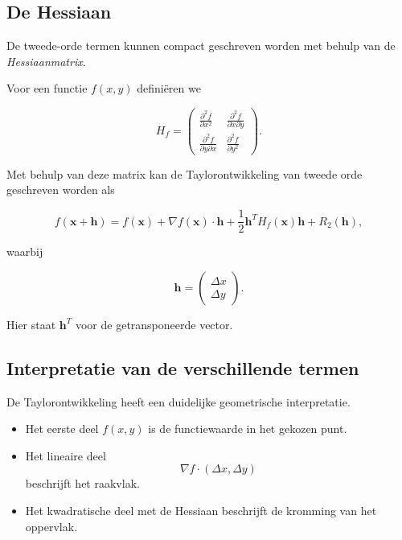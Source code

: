 \documentclass[11pt,a4paper]{article}
\begin{document}
    \subsection{De Hessiaan}

    De tweede-orde termen kunnen compact geschreven worden met behulp van
    de \textit{Hessiaanmatrix}.

    Voor een functie $f(x,y)$ definiëren we

    \[
        H_f =
        \begin{pmatrix}
            \frac{\partial^2 f}{\partial x^2} &
            \frac{\partial^2 f}{\partial x \partial y} \\
            \frac{\partial^2 f}{\partial y \partial x} &
            \frac{\partial^2 f}{\partial y^2}
        \end{pmatrix}.
    \]

    Met behulp van deze matrix kan de Taylorontwikkeling van tweede orde
    geschreven worden als

    \[
        f(\mathbf{x}+\mathbf{h})
        =
        f(\mathbf{x})
        +
        \nabla f(\mathbf{x}) \cdot \mathbf{h}
        +
        \frac{1}{2}
        \mathbf{h}^T H_f(\mathbf{x}) \mathbf{h}
        +
        R_2(\mathbf{h}),
    \]

    waarbij

    \[
        \mathbf{h} =
        \begin{pmatrix}
            \Delta x \\
            \Delta y
        \end{pmatrix}.
    \]

    Hier staat $\mathbf{h}^T$ voor de getransponeerde vector.

    \subsection{Interpretatie van de verschillende termen}

    De Taylorontwikkeling heeft een duidelijke geometrische interpretatie.

    \begin{itemize}

        \item Het eerste deel $f(x,y)$ is de functiewaarde in het gekozen punt.

        \item Het lineaire deel
        \[
            \nabla f \cdot (\Delta x,\Delta y)
        \]
        beschrijft het raakvlak.

        \item Het kwadratische deel met de Hessiaan beschrijft de kromming
        van het oppervlak.

    \end{itemize}
\end{document}
